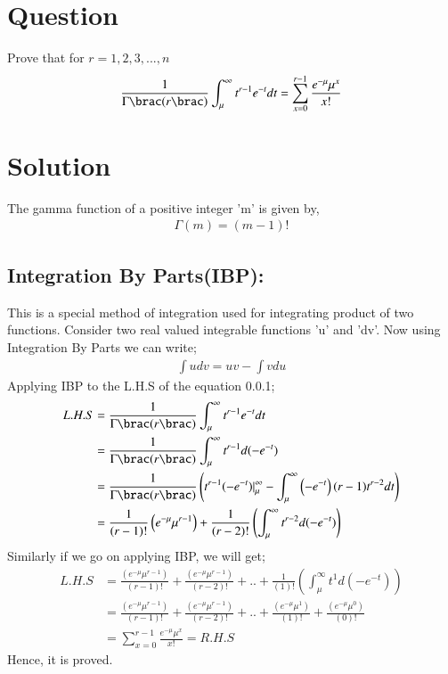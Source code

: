 \documentclass[journal,12pt,twocolumn]{IEEEtran}
\begin{document}
\section*{Question}
Prove that for $r=1,2,3,...,n$
\begin{align}
    \frac{1}{\Gamma{\brac}(r{\brac})}\int_{\mu}^{\infty}{t^{r-1}}{e^{-t}}dt=\sum_{x=0}^{r-1}\frac{{e^{-\mu}}{{\mu}^x}}{x!}
\end{align}
\section*{Solution}
The gamma function of a positive integer 'm' is given by,
\begin{align}
    \Gamma(m)=(m-1)!
\end{align}
\subsection*{Integration By Parts(IBP):}
This is a special method of integration used for integrating product of two functions. Consider two real valued integrable functions 'u' and 'dv'. Now using Integration By Parts we can write;
\begin{align}
    \int{u}{dv}=uv-\int{v}{du}
\end{align}
Applying IBP to the L.H.S of the equation 0.0.1;
\begin{align}
     L.H.S&=\frac{1}{\Gamma{\brac}(r{\brac})}\int_{\mu}^{\infty}{t^{r-1}}{e^{-t}}dt\\
     &=\frac{1}{\Gamma{\brac}(r{\brac})}\int_{\mu}^{\infty}{t^{r-1}}d({-e^{-t}})\\
     &=\frac{1}{\Gamma{\brac}(r{\brac})}\left({t^{r-1}}(-{e^{-t}})|_{\mu}^{\infty}-\int_{\mu}^{\infty}\left(-{e^{-t}}\right)(r-1){t^{r-2}}dt\right)\\
     &=\frac{1}{(r-1)!}\left({e^{-\mu}}{\mu^{r-1}}\right)+\frac{1}{(r-2)!}\left(\int_{\mu}^{\infty}{t^{r-2}}d(-{e^{-t}})\right)
\end{align}
Similarly if we go on applying IBP, we will get;
\begin{align}
   L.H.S &=\frac{\left({e^{-\mu}}{\mu^{r-1}}\right)}{(r-1)!}+\frac{\left({e^{-\mu}}{\mu^{r-1}}\right)}{(r-2)!}+..+\frac{1}{(1)!}\left(\int_{\mu}^{\infty}{t^{1}}d(-{e^{-t}})\right)\\
   &=\frac{\left({e^{-\mu}}{\mu^{r-1}}\right)}{(r-1)!}+\frac{\left({e^{-\mu}}{\mu^{r-1}}\right)}{(r-2)!}+..+\frac{\left({e^{-\mu}}{\mu^1}\right)}{(1)!}+\frac{\left({e^{-\mu}}{\mu^0}\right)}{(0)!}\\
   &=\sum_{x=0}^{r-1}\frac{{e^{-\mu}}{{\mu}^x}}{x!}=R.H.S
\end{align}
Hence, it is proved.\\
\end{document}
